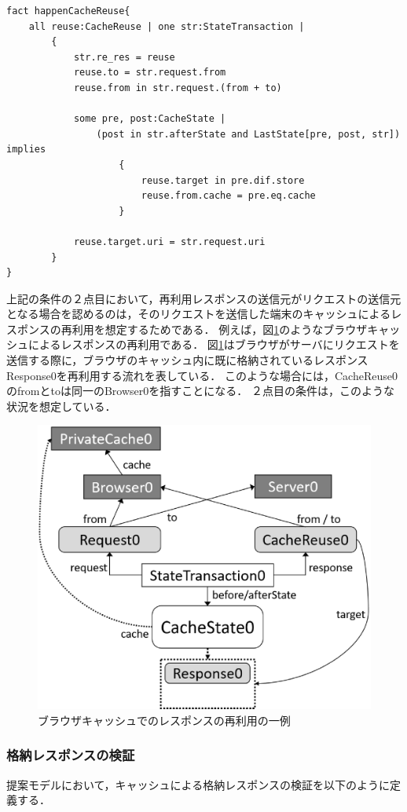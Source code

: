 \documentclass[12pt,a4paper]{jbook}
\begin{document}
\begin{lstlisting}[caption=CacheReuseの発生条件, label=code:happenCacheReuse]
fact happenCacheReuse{
	all reuse:CacheReuse | one str:StateTransaction |
		{
			str.re_res = reuse
			reuse.to = str.request.from
			reuse.from in str.request.(from + to)

			some pre, post:CacheState |
				(post in str.afterState and LastState[pre, post, str]) implies
					{
						reuse.target in pre.dif.store
						reuse.from.cache = pre.eq.cache
					}

			reuse.target.uri = str.request.uri
		}
}
\end{lstlisting}

上記の条件の２点目において，再利用レスポンスの送信元がリクエストの送信元となる場合を認めるのは，そのリクエストを送信した端末のキャッシュによるレスポンスの再利用を想定するためである．
例えば，図\ref{fig:BrowserCacheReuse}のようなブラウザキャッシュによるレスポンスの再利用である．
図\ref{fig:BrowserCacheReuse}はブラウザがサーバにリクエストを送信する際に，ブラウザのキャッシュ内に既に格納されているレスポンスResponse0を再利用する流れを表している．
このような場合には，CacheReuse0のfromとtoは同一のBrowser0を指すことになる．
２点目の条件は，このような状況を想定している．

\begin{figure}[htb]
\centering
\includegraphics[width=350pt]{./fig/BrowserCacheReuse.eps}
\caption{ブラウザキャッシュでのレスポンスの再利用の一例}
\label{fig:BrowserCacheReuse}
\end{figure}

\subsubsection{格納レスポンスの検証}
\label{sec:CacheVerification}
提案モデルにおいて，キャッシュによる格納レスポンスの検証を以下のように定義する．
\end{document}
